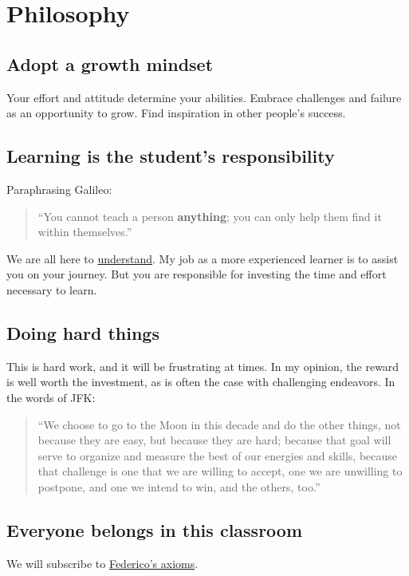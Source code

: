 \documentclass[11pt]{article}
\begin{document}
\section*{Philosophy}
\label{sec:org3796ae3}
\subsection*{Adopt a growth mindset}
\label{sec:org103280e}
Your effort and attitude determine your abilities. Embrace challenges and
failure as an opportunity to grow. Find inspiration in other people's success.

\subsection*{Learning is the student's responsibility}
\label{sec:org64bfe04}
Paraphrasing Galileo:
\begin{quote}
``You cannot teach a person \textbf{anything}; you can only help
them find it within themselves.''
\end{quote}
We are all here to \uline{understand}. My job as a more experienced learner is to
assist you on your journey. But you are responsible for investing the time and
effort necessary to learn.

\subsection*{Doing hard things}
\label{sec:orga33472a}
This is hard work, and it will be frustrating at times. In my opinion, the
reward is well worth the investment, as is often the case with challenging
endeavors. In the words of JFK:
\begin{quote}
``We choose to go to the Moon in this decade and do the other things, not
because they are easy, but because they are hard; because that goal will serve
to organize and measure the best of our energies and skills, because that
challenge is one that we are willing to accept, one we are unwilling to
postpone, and one we intend to win, and the others, too.''
\end{quote}

\subsection*{Everyone belongs in this classroom}
\label{sec:org2c28e79}
We will subscribe to \href{https://www.ams.org/publications/journals/notices/201610/rnoti-p1164.pdf}{Federico's axioms}.
\end{document}
